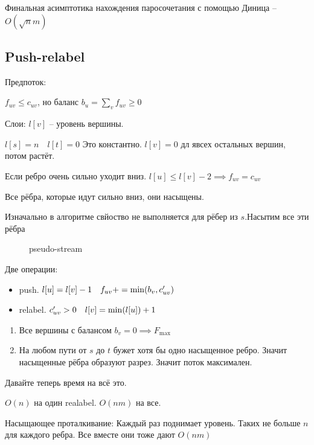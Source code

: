 Финальная асимптотика нахождения паросочетания с помощью Диница -- $O(\sqrt{n}m)$

\subsection{Push-relabel}

\begin{definition}
    Предпоток: 
    
    $f_{uv} \leqslant c_{uv}$, но баланс $b_u = \sum_v f_{uv} \geqslant 0$

    Слои: $l[v] $ -- уровень вершины.

    $l[s] = n\quad l[t] = 0$ Это константно. $l[v] = 0$ дл явсех остальных вершин, потом растёт.
\end{definition}

\begin{property}
    Если ребро очень сильно уходит вниз. $l[u] \leqslant l[v] -2 \implies f_{uv} = c_{uv}$

    Все рёбра, которые идут сильно вниз, они насыщены.
\end{property}

Изначально в алгоритме свйоство не выполняется для рёбер из $s$.Насытим все эти рёбра

\begin{figure}[!ht]
    \centering
    \caption{pseudo-stream}
    \label{fig:pseudo-stream}
\end{figure}

Две операции:
\begin{itemize}
    \item push. $l[u] = l[v] - 1\quad f_{uv} += \min(b_v, c^{\prime}_{uv})$
    \item relabel. $c^{\prime}_{uv} > 0\quad l[v] = \min(l[u]) + 1$
\end{itemize}

\begin{enumerate}
    \item Все вершины с балансом $b_v = 0 \implies F_{\max}$
    \item На любом пути от $s$ до $t$ бужет хотя бы одно насыщенное ребро. Значит насыщенные рёбра образуют разрез. Значит поток максимален.  
\end{enumerate}

Давайте теперь время на всё это.

$O(n)$ на один realabel. $O(nm)$ на все.

Насыщающее проталкивание: Каждый раз поднимает уровень. Таких не больше $n$ для каждого ребра. Все вместе они тоже дают $O(nm)$


